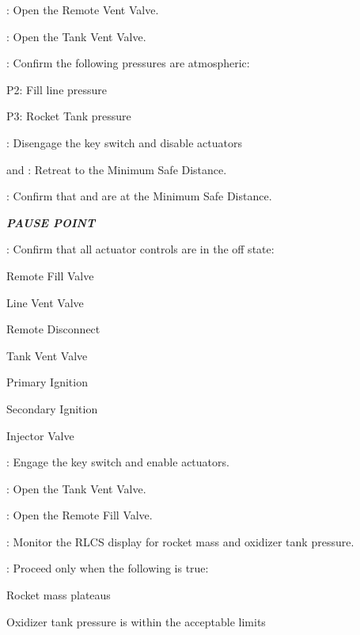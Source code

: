\begin{checklist}
\begin{checklist}[label=$\bullet$]
\begin{checklist}
        \end{checklist}
    \end{checklist}
    \item \control{}: Open the Remote Vent Valve.
    \item \control{}: Open the Tank Vent Valve.
    \item \control{}: Confirm the following pressures are atmospheric:
    \begin{checklist}
        \item P2: Fill line pressure
        \item P3: Rocket Tank pressure
    \end{checklist}
    \item \control{}: Disengage the key switch and disable actuators
    \item \primary{} and \secondary{}: Retreat to the Minimum Safe Distance.
    \item \secondary{}: Confirm that \primary{} and \secondary{} are at the Minimum Safe Distance.
    \item \textbf{\textit{PAUSE POINT}}
    \item \control: Confirm that all actuator controls are in the off state:
    \begin{checklist}
        \item Remote Fill Valve
        \item Line Vent Valve
        \item Remote Disconnect
        \item Tank Vent Valve
        \item Primary Ignition
        \item Secondary Ignition
        \item Injector Valve
    \end{checklist}
    \item \control{}: Engage the key switch and enable actuators.
    \item \control{}: Open the Tank Vent Valve.
    \item \control{}: Open the Remote Fill Valve.
    \item \control{}: Monitor the RLCS display for rocket mass and oxidizer tank pressure.
    \item \ops{}: Proceed only when the following is true:
    \begin{checklist}
        \item Rocket mass plateaus
        \item Oxidizer tank pressure is within the acceptable limits

\end{checklist}
\end{checklist}
